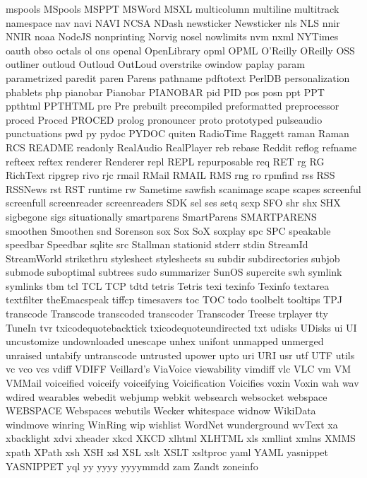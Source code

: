 mspools
MSpools
MSPPT
MSWord
MSXL
multicolumn
multiline
multitrack
namespace
nav
navi
NAVI
NCSA
NDash
newsticker
Newsticker
nls
NLS
nnir
NNIR
noaa
NodeJS
nonprinting
Norvig
nosel
nowlimits
nvm
nxml
NYTimes
oauth
obso
octals
ol
ons
openal
OpenLibrary
opml
OPML
O'Reilly
OReilly
OSS
outliner
outloud
Outloud
OutLoud
overstrike
owindow
paplay
param
parametrized
paredit
paren
Parens
pathname
pdftotext
PerlDB
personalization
phablets
php
pianobar
Pianobar
PIANOBAR
pid
PID
pos
posn
ppt
PPT
ppthtml
PPTHTML
pre
Pre
prebuilt
precompiled
preformatted
preprocessor
proced
Proced
PROCED
prolog
pronouncer
proto
prototyped
pulseaudio
punctuations
pwd
py
pydoc
PYDOC
quiten
RadioTime
Raggett
raman
Raman
RCS
README
readonly
RealAudio
RealPlayer
reb
rebase
Reddit
reflog
refname
refteex
reftex
renderer
Renderer
repl
REPL
repurposable
req
RET
rg
RG
RichText
ripgrep
rivo
rjc
rmail
RMail
RMAIL
RMS
rng
ro
rpmfind
rss
RSS
RSSNews
rst
RST
runtime
rw
Sametime
sawfish
scanimage
scape
scapes
screenful
screenfull
screenreader
screenreaders
SDK
sel
ses
setq
sexp
SFO
shr
shx
SHX
sigbegone
sigs
situationally
smartparens
SmartParens
SMARTPARENS
smoothen
Smoothen
snd
Sorenson
sox
Sox
SoX
soxplay
spc
SPC
speakable
speedbar
Speedbar
sqlite
src
Stallman
stationid
stderr
stdin
StreamId
StreamWorld
strikethru
stylesheet
stylesheets
su
subdir
subdirectories
subjob
submode
suboptimal
subtrees
sudo
summarizer
SunOS
supercite
swh
symlink
symlinks
tbm
tcl
TCL
TCP
tdtd
tetris
Tetris
texi
texinfo
Texinfo
textarea
textfilter
theEmacspeak
tiffcp
timesavers
toc
TOC
todo
toolbelt
tooltips
TPJ
transcode
Transcode
transcoded
transcoder
Transcoder
Treese
trplayer
tty
TuneIn
tvr
txicodequotebacktick
txicodequoteundirected
txt
udisks
UDisks
ui
UI
uncustomize
undownloaded
unescape
unhex
unifont
unmapped
unmerged
unraised
untabify
untranscode
untrusted
upower
upto
uri
URI
usr
utf
UTF
utils
vc
vco
vcs
vdiff
VDIFF
Veillard's
ViaVoice
viewability
vimdiff
vlc
VLC
vm
VM
VMMail
voiceified
voiceify
voiceifying
Voicification
Voicifies
voxin
Voxin
wah
wav
wdired
wearables
webedit
webjump
webkit
websearch
websocket
webspace
WEBSPACE
Webspaces
webutils
Wecker
whitespace
widnow
WikiData
windmove
winring
WinRing
wip
wishlist
WordNet
wunderground
wvText
xa
xbacklight
xdvi
xheader
xkcd
XKCD
xlhtml
XLHTML
xls
xmllint
xmlns
XMMS
xpath
XPath
xsh
XSH
xsl
XSL
xslt
XSLT
xsltproc
yaml
YAML
yasnippet
YASNIPPET
yql
yy
yyyy
yyyymmdd
zam
Zandt
zoneinfo
